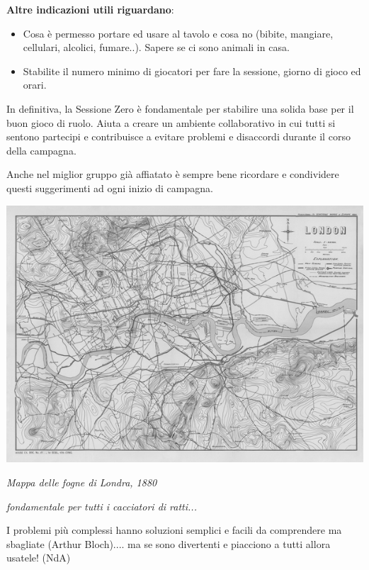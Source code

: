 \begin{multicols}{2}
\textbf{Altre indicazioni utili riguardano}:

\medskip

\begin{itemize}[leftmargin=*] \setlength{\itemsep}{0pt}
\item Cosa è permesso portare ed usare al tavolo e cosa no (bibite, mangiare, cellulari, alcolici, fumare..). Sapere se ci sono animali in casa.
\item Stabilite il numero minimo di giocatori per fare la sessione, giorno di gioco ed orari.
\end{itemize}

In definitiva, la Sessione Zero è fondamentale per stabilire una solida base per il buon gioco di ruolo. Aiuta a creare un ambiente collaborativo in cui tutti si sentono partecipi e contribuisce a evitare problemi e disaccordi durante il corso della campagna.

Anche nel miglior gruppo già affiatato è sempre bene ricordare e condividere questi suggerimenti ad ogni inizio di campagna.

\end{multicols}

\vfill

\begin{center}
\includegraphics[width=0.95\linewidth]{immagini/fognelondra.png}

\emph{Mappa delle fogne di Londra, 1880}

\emph{fondamentale per tutti i cacciatori di ratti...}
\end{center}

\bigskip

\begin{changemargin}{0.3cm}{0.3cm}\begin{enfasi}
{
I problemi più complessi hanno soluzioni semplici e facili da comprendere ma sbagliate (Arthur Bloch).... ma se sono divertenti e piacciono a tutti allora usatele! (NdA)
}
\end{enfasi}\end{changemargin}\medskip


%

\pagebreak
